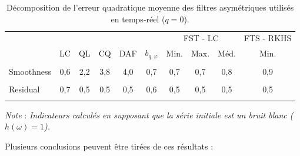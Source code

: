 \documentclass[
  11pt,
  french,
  a4paper]{article}
\newcommand\1{\mathds{1}}
\begin{document}
\begin{table}[!h]

\caption{\label{tab:tab-mse-q0}Décomposition de l'erreur quadratique moyenne des filtres asymétriques utilisés en temps-réel ($q=0$).}
\centering
\begin{tabular}[t]{lccccccccc}
\toprule
\multicolumn{6}{c}{ } & \multicolumn{3}{c}{FST - LC} & \multicolumn{1}{c}{FTS - RKHS} \\
\cmidrule(l{3pt}r{3pt}){7-9} \cmidrule(l{3pt}r{3pt}){10-10}
  & LC & QL & CQ & DAF & $b_{q,\varphi}$ & Min. & Max. & Méd. & Min.\\
\midrule
\cellcolor{gray!6}{Accuracy} & \cellcolor{gray!6}{0,4} & \cellcolor{gray!6}{0,4} & \cellcolor{gray!6}{0,4} & \cellcolor{gray!6}{0,4} & \cellcolor{gray!6}{0,4} & \cellcolor{gray!6}{0,4} & \cellcolor{gray!6}{0,5} & \cellcolor{gray!6}{0,4} & \cellcolor{gray!6}{0,4}\\
Smoothness & 0,6 & 2,2 & 3,8 & 4,0 & 0,7 & 0,7 & 0,7 & 0,8 & 0,9\\
\cellcolor{gray!6}{Timeliness} & \cellcolor{gray!6}{0,5} & \cellcolor{gray!6}{0,6} & \cellcolor{gray!6}{0,6} & \cellcolor{gray!6}{0,6} & \cellcolor{gray!6}{0,5} & \cellcolor{gray!6}{0,5} & \cellcolor{gray!6}{0,5} & \cellcolor{gray!6}{0,5} & \cellcolor{gray!6}{0,5}\\
Residual & 0,7 & 0,5 & 0,5 & 0,5 & 0,6 & 0,5 & 0,5 & 0,5 & 0,5\\
\cellcolor{gray!6}{RMSE} & \cellcolor{gray!6}{2,2} & \cellcolor{gray!6}{3,7} & \cellcolor{gray!6}{5,2} & \cellcolor{gray!6}{5,5} & \cellcolor{gray!6}{2,2} & \cellcolor{gray!6}{2,2} & \cellcolor{gray!6}{2,1} & \cellcolor{gray!6}{2,2} & \cellcolor{gray!6}{2,3}\\
\bottomrule
\end{tabular}
\footnotesize


\emph{Note} : \emph{Indicateurs calculés en supposant que la série initiale est un bruit blanc (\(h(\omega)=1\)).}
\normalsize\end{table}

Plusieurs conclusions peuvent être tirées de ces résultats :
\end{document}
